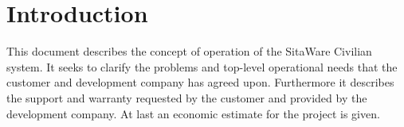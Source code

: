 \chapter{Introduction}
This document describes the concept of operation of the SitaWare Civilian system. It seeks to clarify the problems and top-level operational needs that the customer and development company has agreed upon. Furthermore it describes the support and warranty requested by the customer and provided by the development company. At last an economic estimate for the project is given. 